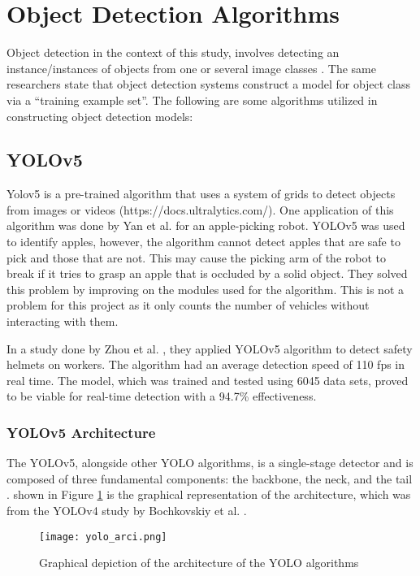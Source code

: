 \section{Object Detection Algorithms}
Object detection in the context of this study, involves detecting an instance/instances of objects from one or several image classes \cite{Amit_Felzenszwalb_Girshick_2020}. The same researchers state that object detection systems construct a model for object class via a “training example set”. The following are some algorithms utilized in constructing object detection models:

\subsection{YOLOv5}

Yolov5 is a pre-trained algorithm that uses a system of grids to detect objects from images or videos (https://docs.ultralytics.com/). 
One application of this algorithm was done by Yan et al. \citeyear{yan_2021} for an apple-picking robot. YOLOv5 was used to identify apples, however, the algorithm cannot detect apples that are safe to pick and those that are not. This may cause the picking arm of the robot to break if it tries to grasp an apple that is occluded by a solid object. They solved this problem by improving on the modules used for the algorithm. This is not a problem for this project as it only counts the number of vehicles without interacting with them. 

In a study done by Zhou et al. \citeyear{zhou_2021}, they applied YOLOv5 algorithm to detect safety helmets on workers. The algorithm had an average detection speed of 110 fps in real time. The model, which was trained and tested using 6045 data sets, proved to be viable for real-time detection with a 94.7\% effectiveness.


\subsubsection{YOLOv5 Architecture}
The YOLOv5, alongside other YOLO algorithms, is a single-stage detector and is composed of three fundamental components: the backbone, the neck, and the tail \cite{Solawetz_2020}. shown in Figure \ref{fig:yolo_archi} is the graphical representation of the architecture, which was from the YOLOv4 study by Bochkovskiy et al. \citeyear{Bochkovskiy_Wang_Liao_2020}.

\begin{figure}[!htbp]
	\texttt{[image: yolo\_arci.png]}
	\caption{Graphical depiction of the architecture of the YOLO algorithms}
	\label{fig:yolo_archi}
\end{figure}
\FloatBarrier


